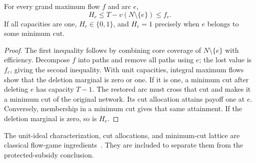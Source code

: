 \begin{lemma}\label{flow:ideals}
For every grand maximum flow $f$ and arc $e$,
\[
                    H_e\le T-v(N\setminus\{e\})\le f_e.
\]
If all capacities are one, $H_e\in\{0,1\}$, and $H_e=1$ precisely
when $e$ belongs to some minimum cut.
\end{lemma}
\begin{proof}
The first inequality follows by combining core coverage of
$N\setminus\{e\}$ with efficiency. Decompose $f$ into paths and remove
all paths using $e$; the lost value is $f_e$, giving the second inequality.
With unit capacities, integral maximum flows show that the deletion
marginal is zero or one. If it is one, a minimum cut after deleting $e$
has capacity $T-1$. The restored arc must cross that cut and makes it a
minimum cut of the original network. Its cut allocation attains payoff
one at $e$. Conversely, membership in a minimum cut gives that same
attainment. If the deletion marginal is zero, so is $H_e$.
\end{proof}
The unit-ideal characterization, cut allocations, and minimum-cut lattice
are classical flow-game ingredients~\cite{flow:Fang2010,flow:KalaiZemel1980}.
They are included to separate them from the protected-subsidy conclusion.

